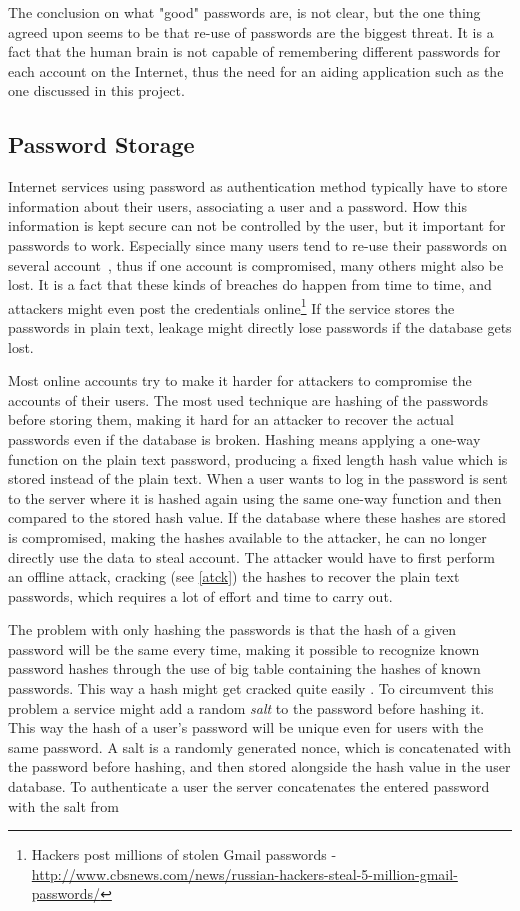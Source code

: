 \par The conclusion on what "good" passwords are, is not clear, but the one thing agreed upon seems to be that re-use of passwords are the biggest threat. It is a fact that the human brain is not capable of remembering different passwords for each account on the Internet, thus the need for an aiding application such as the one discussed in this project. 

\subsection{Password Storage}\label{pw-storage}
Internet services using password as authentication method typically have to store information about their users, associating a user and a password. How this information is kept secure can not be controlled by the user, but it important for passwords to work. Especially since many users tend to re-use their passwords on several account~\cite{domino-effect}, thus if one account is compromised, many others might also be lost. It is a fact that these kinds of breaches do happen from time to time, and attackers might even post the credentials online\footnote{Hackers post millions of stolen Gmail passwords - \url{http://www.cbsnews.com/news/russian-hackers-steal-5-million-gmail-passwords/} } If the service stores the passwords in plain text, leakage might directly lose passwords if the database gets lost.
\par Most online accounts try to make it harder for attackers to compromise the accounts of their users. The most used technique are hashing of the passwords before storing them, making it hard for an attacker to recover the actual passwords even if the database is broken. Hashing means applying a one-way function on the plain text password, producing a fixed length hash value which is stored instead of the plain text. When a user wants to log in the password is sent to the server where it is hashed again using the same one-way function and then compared to the stored hash value. If the database where these hashes are stored is compromised, making the hashes available to the attacker, he can no longer directly use the data to steal account. The attacker would have to first perform an offline attack, cracking (see \autoref{atck}) the hashes to recover the plain text passwords, which requires a lot of effort and time to carry out. 
\par The problem with only hashing the passwords is that the hash of a given password will be the same every time, making it possible to recognize known password hashes through the use of big table containing the hashes of known passwords. This way a hash might get cracked quite easily . To circumvent this problem a service might add a random \emph{salt} to the password before hashing it. This way the hash of a user's password will be unique even for users with the same password. A salt is a randomly generated nonce, which is concatenated with the password before hashing, and then stored alongside the hash value in the user database. To authenticate a user the server concatenates the entered password with the salt from 

